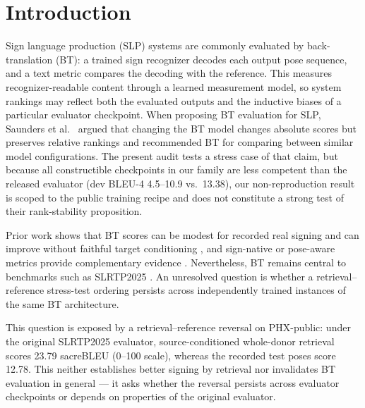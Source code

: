 \documentclass[pdflatex,sn-chicago]{sn-jnl}
\begin{document}

\maketitle

\section{Introduction}

Sign language production (SLP) systems are commonly evaluated by back-translation (BT): a trained sign recognizer decodes each output pose sequence, and a text metric compares the decoding with the reference. This measures recognizer-readable content through a learned measurement model, so system rankings may reflect both the evaluated outputs and the inductive biases of a particular evaluator checkpoint. When proposing BT evaluation for SLP, Saunders et al.~\cite{saunders2021continuous} argued that changing the BT model changes absolute scores but preserves relative rankings and recommended BT for comparing between similar model configurations. The present audit tests a stress case of that claim, but because all constructible checkpoints in our family are less competent than the released evaluator (dev BLEU-4 4.5--10.9 vs.\ 13.38), our non-reproduction result is scoped to the public training recipe and does not constitute a strong test of their rank-stability proposition.

Prior work shows that BT scores can be modest for recorded real signing and can improve without faithful target conditioning \cite{walsh2024datadriven,hong2026conditional}, and sign-native or pose-aware metrics provide complementary evidence \cite{signbleu,silverscore,jiang2025meaningful}. Nevertheless, BT remains central to benchmarks such as SLRTP2025 \cite{slrtp2025}. An unresolved question is whether a retrieval--reference stress-test ordering persists across independently trained instances of the same BT architecture.

This question is exposed by a retrieval--reference reversal on PHX-public: under the original SLRTP2025 evaluator, source-conditioned whole-donor retrieval scores 23.79 sacreBLEU (0--100 scale), whereas the recorded test poses score 12.78. This neither establishes better signing by retrieval nor invalidates BT evaluation in general --- it asks whether the reversal persists across evaluator checkpoints or depends on properties of the original evaluator.
\end{document}
